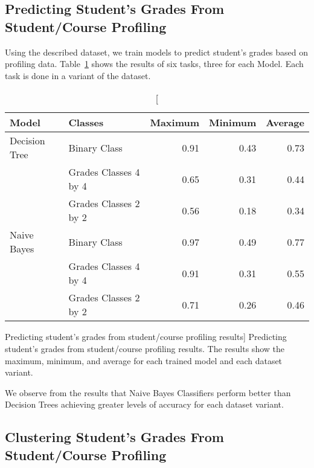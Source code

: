 \subsection{Predicting Student's Grades From Student/Course Profiling}
\label{sec:exp_005}

Using the described dataset, we train models to predict student's grades based
on profiling data. Table~\ref{tab:exp_005_res} shows the results of six tasks,
three for each Model. Each task is done in a variant of the dataset.

\begin{table}[h!]
    \centering

    \begin{tabular}{| l | l | r | r | r |}
        \hline
        \textbf{Model} & \textbf{Classes} & \textbf{Maximum} & \textbf{Minimum} & \textbf{Average} \\ \hline
        Decision Tree & Binary Class          & 0.91 & 0.43 & 0.73 \\
                      & Grades Classes 4 by 4 & 0.65 & 0.31 & 0.44 \\
                      & Grades Classes 2 by 2 & 0.56 & 0.18 & 0.34 \\ \hline
        Naive Bayes   & Binary Class          & 0.97 & 0.49 & 0.77 \\
                      & Grades Classes 4 by 4 & 0.91 & 0.31 & 0.55 \\
                      & Grades Classes 2 by 2 & 0.71 & 0.26 & 0.46 \\ \hline
    \end{tabular}

    \caption
        [Predicting student's grades from student/course profiling results]
        {Predicting student's grades from student/course profiling results. The
        results show the maximum, minimum, and average for each trained model
        and each dataset variant.}

    \label{tab:exp_005_res}
\end{table}

We observe from the results that Naive Bayes Classifiers perform better than
Decision Trees achieving greater levels of accuracy for each dataset variant.

\subsection{Clustering Student's Grades From Student/Course Profiling}
\label{sec:exp_006}


